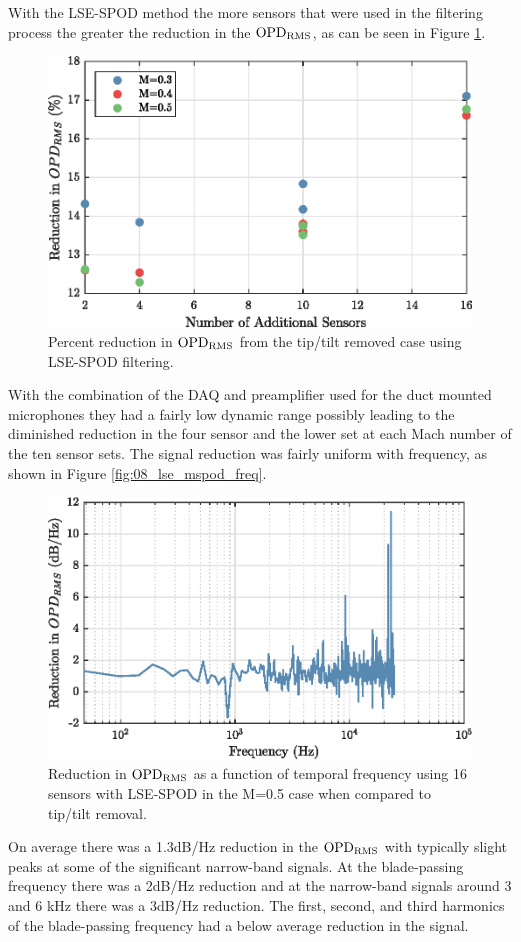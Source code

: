 With the LSE-SPOD method the more sensors that were used in the filtering process the greater the reduction in the $\operatorname{OPD_{RMS}}$, as can be seen in Figure \ref{fig:08_lse_summary}.
\begin{figure}
  \centering
  \includegraphics{../matlab/08_conclusion/lse_summary.eps}
  \caption{Percent reduction in $\operatorname{OPD_{RMS}}$ from the tip/tilt removed case using LSE-SPOD filtering.}
  \label{fig:08_lse_summary}
\end{figure}
With the combination of the DAQ and preamplifier used for the duct mounted microphones they had a fairly low dynamic range possibly leading to the diminished reduction in the four sensor and the lower set at each Mach number of the ten sensor sets.
The signal reduction was fairly uniform with frequency, as shown in Figure \ref{fig:08_lse_mspod_freq}.
\begin{figure}
  \centering
  \includegraphics{../matlab/07_multiple_sensor_filtering/lse_mspod_freq.eps}
  \caption{Reduction in $\operatorname{OPD_{RMS}}$ as a function of temporal frequency using 16 sensors with LSE-SPOD in the M=0.5 case when compared to tip/tilt removal.}
\end{figure}
On average there was a 1.3dB/Hz reduction in the $\operatorname{OPD_{RMS}}$ with typically slight peaks at some of the significant narrow-band signals.
At the blade-passing frequency there was a 2dB/Hz reduction and at the narrow-band signals around 3 and 6 kHz there was a 3dB/Hz reduction.
The first, second, and third harmonics of the blade-passing frequency had a below average reduction in the signal.

